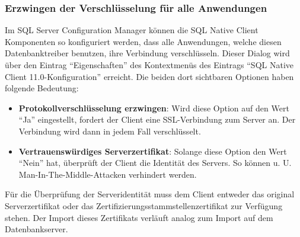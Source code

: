         \subsubsection{Erzwingen der Verschlüsselung für alle Anwendungen}
          Im SQL Server Configuration Manager können die SQL Native Client
          Komponenten so konfiguriert werden, dass alle Anwendungen, welche
          diesen Datenbanktreiber benutzen, ihre Verbindung verschlüsseln.
          Dieser Dialog wird über den Eintrag \enquote{Eigenschaften} des
          Kontextmenüs des Eintrags \enquote{SQL Native Client
          11.0-Konfiguration} erreicht. Die beiden dort sichtbaren Optionen
          haben folgende Bedeutung:
          \begin{itemize}
            \item \textbf{Protokollverschlüsselung erzwingen}: Wird diese Option
            auf den Wert \enquote{Ja} eingestellt, fordert der Client eine
            SSL-Verbindung zum Server an. Der Verbindung wird dann in jedem Fall
            verschlüsselt.
            \item \textbf{Vertrauenswürdiges Serverzertifikat}: Solange diese
            Option den Wert \enquote{Nein} hat, überprüft der Client die
            Identität des Servers. So können u. U. Man-In-The-Middle-Attacken
            verhindert werden.
          \end{itemize}
          \begin{merke}
            Für die Überprüfung der Serveridentität muss dem Client entweder das
            original Serverzertifikat oder das
            Zertifizierungsstammstellenzertifikat zur Verfügung stehen. Der
            Import dieses Zertifikats verläuft analog zum Import auf dem
            Datenbankserver.
          \end{merke}
